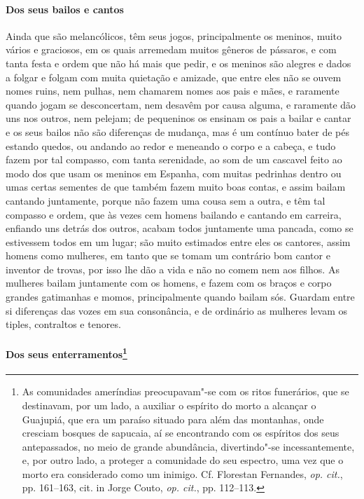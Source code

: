 \paragraph{Dos seus bailos e cantos}

Ainda que são melancólicos, têm seus jogos, principalmente os
meninos, muito vários e graciosos, em os quais arremedam muitos gêneros
de pássaros, e com tanta festa e ordem que não há mais que pedir, e os
meninos são alegres e dados a folgar e folgam com muita quietação e
amizade, que entre eles não se ouvem nomes ruins, nem pulhas, nem
chamarem nomes aos pais e mães, e raramente quando jogam se
desconcertam, nem desavêm por causa alguma, e raramente dão uns nos
outros, nem pelejam; de pequeninos os ensinam os pais a bailar e cantar
e os seus bailos não são diferenças de mudança, mas é um contínuo bater
de pés estando quedos, ou andando ao redor e meneando o corpo e a
cabeça, e tudo fazem por tal compasso, com tanta serenidade, ao som de
um cascavel feito ao modo dos que usam os meninos em Espanha, com
muitas pedrinhas dentro ou umas certas sementes de que também fazem
muito boas contas, e assim bailam cantando juntamente, porque não fazem
uma cousa sem a outra, e têm tal compasso e ordem, que às vezes cem
homens bailando e cantando em carreira, enfiando uns detrás dos outros,
acabam todos juntamente uma pancada, como se estivessem todos em um
lugar; são muito estimados entre eles os cantores, assim homens como
mulheres, em tanto que se tomam um contrário bom cantor e inventor de
trovas, por isso lhe dão a vida e não no comem nem aos filhos. As
mulheres bailam juntamente com os homens, e fazem com os braços e corpo
grandes gatimanhas e momos, principalmente quando bailam sós. Guardam
entre si diferenças das vozes em sua consonância, e de ordinário as
mulheres levam os tiples, contraltos e tenores. 

\paragraph[Dos seus enterramentos]{Dos seus enterramentos\protect\footnote{ As comunidades ameríndias
preocupavam"-se com os ritos funerários, que se destinavam, por um lado,
a auxiliar o espírito do morto a alcançar o Guajupiá, que era um
paraíso situado para além das montanhas, onde cresciam bosques de
sapucaia, aí se encontrando com os espíritos dos seus antepassados, no
meio de grande abundância, divertindo"-se incessantemente, e, por outro
lado, a proteger a comunidade do seu espectro, uma vez que o morto era
considerado como um inimigo. Cf. Florestan Fernandes, \textit{op.
cit.}, pp. 161--163, cit. in Jorge Couto, \textit{op. cit.}, pp. 112--113.}}

